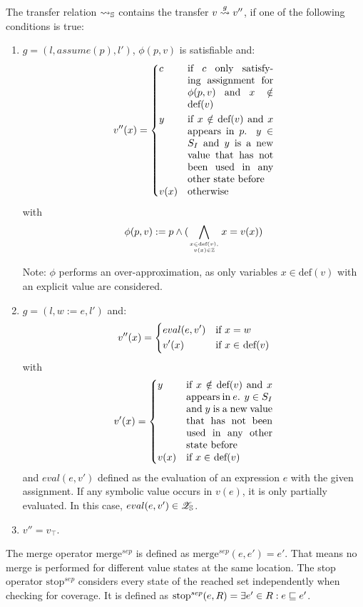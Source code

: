 The transfer relation $\rightsquigarrow_{\mathbb{S}}$ contains the transfer $v \overset{g}{\rightsquigarrow} v''$, if one of the following conditions is true:
    \begin{enumerate}[1.]
      \item $g = (l, assume(p), l')$, $\phi (p, v)$ is satisfiable and:
        \[
          v''(x) = \begin{dcases}
            c    & \parbox[t]{.25\textwidth}{if $c$ only satisfying assignment for $\phi (p, v)$ and $x \notin$ def$(v)$}\\
            y    & \parbox[t]{.25\textwidth}{if $x \notin \text{def}(v)$ and $x$ appears in $p$. $y \in S_I$ and $y$ is a new value that has not been used in any other state before}\\
            v(x) & \text{otherwise}              
          \end{dcases}
        \]
        with \[\phi (p, v) := p \wedge (\displaystyle\bigwedge_{x \in \text{def}(v),\atop {v(x) \in \mathbb{Z}}} x = v(x))\]

        Note: $\phi$ performs an over-approximation, as only variables $x \in \text{def}(v)$ with an explicit value are considered.

      \item $g = (l, w := e, l')$ and:
        \[
          v''(x) = \begin{dcases}
            eval(e, v') & \text{if $x = w$} \\
            v'(x)       & \text{if $x \in$ def$(v)$}
          \end{dcases}
        \]
      with \[
         v'(x) = \begin{dcases}
            y    & \parbox[t]{.25\textwidth}{if $x \notin \text{def}(v)$ and $x$ appears in $e$. $y \in S_I$ and $y$ is a new value that has not been used in any other state before}\\
            v(x) & \text{if $x \in$ def$(v)$}
          \end{dcases}
      \]
      and $eval(e, v')$ defined as the evaluation of an expression $e$ with the given assignment.
      If any symbolic value occurs in $v(e)$, it is only partially evaluated. In this case, $eval(e, v') \in \mathscr{Z}_{\mathbb{S}}$.

      \item $v'' = v_\top$.
    \end{enumerate}
The merge operator $\text{merge}^{sep}$ is defined as $\text{merge}^{sep}(e, e') = e'$.
That means no merge is performed for different value states at the same location.
The stop operator $\text{stop}^{sep}$ considers every state of the reached set independently when checking for coverage.
It is defined as $\text{stop}^{sep}(e, R) = \exists e' \in R: e \sqsubseteq e'$.
